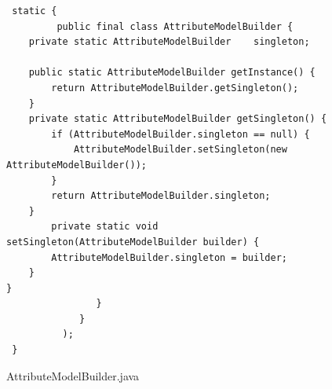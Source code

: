 \begin{figure}[!tbp]
\centering
\lstset{language=Java, stepnumber=1, showspaces=false, showstringspaces=false,breaklines=true}
\begin{lstlisting}
 static {
         public final class AttributeModelBuilder {
	private static AttributeModelBuilder	singleton;

	public static AttributeModelBuilder getInstance() {
		return AttributeModelBuilder.getSingleton();
	}
	private static AttributeModelBuilder getSingleton() {
		if (AttributeModelBuilder.singleton == null) {
			AttributeModelBuilder.setSingleton(new AttributeModelBuilder());
		}
		return AttributeModelBuilder.singleton;
	}
		private static void setSingleton(AttributeModelBuilder builder) {
		AttributeModelBuilder.singleton = builder;
	}
}
                }
             }
          );
 }
\end{lstlisting}
\caption{AttributeModelBuilder.java}
\label{AttributeModelBuilder}
\end{figure}